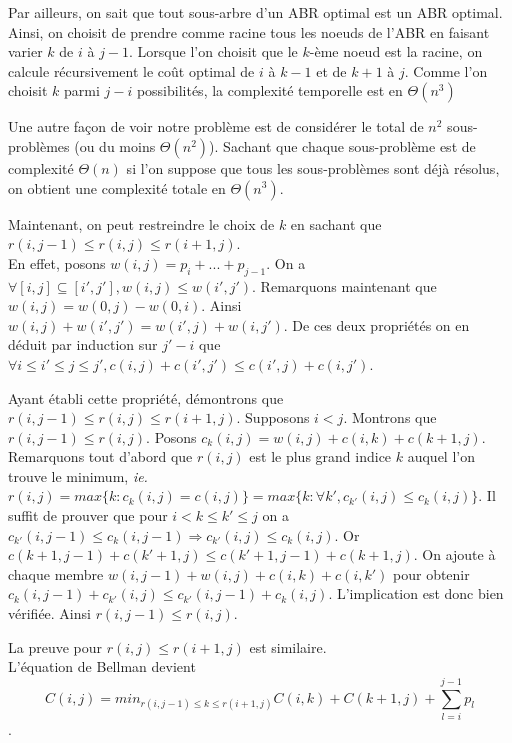 \documentclass[a4paper, 10pt, french]{article}
\begin{document}
Par ailleurs, on sait que tout sous-arbre d'un ABR optimal est un ABR optimal. Ainsi, on choisit de prendre comme racine tous les noeuds de l'ABR en faisant varier $k$ de $i$ à $j - 1$. Lorsque l'on choisit que le $k$-ème noeud est la racine, on calcule récursivement le coût optimal de $i$ à $k - 1$ et de $k + 1$ à $j$. Comme l'on choisit $k$ parmi $j - i$ possibilités, la complexité temporelle est en $\Theta(n^3)$

Une autre façon de voir notre problème est de considérer le total de $n^2$ sous-problèmes (ou du moins $\Theta(n^2)$). Sachant que chaque sous-problème est de complexité $\Theta(n)$ si l'on suppose que tous les sous-problèmes sont déjà résolus, on obtient une complexité totale en $\Theta(n^3)$.

Maintenant, on peut restreindre le choix de $k$ en sachant que $r(i, j - 1) \leq r(i, j) \leq r(i + 1, j)$. \\

En effet, posons $w(i, j) = p_{i} + ... + p_{j - 1}$. On a $\forall [i, j] \subseteq [i', j'], w(i, j) \leq w(i', j')$. Remarquons maintenant que $w(i, j) = w(0, j) - w(0, i)$. Ainsi $w(i, j) + w(i', j') = w(i', j) + w(i, j')$. De ces deux propriétés on en déduit par induction sur $j' - i$ que $\forall i \leq i'\leq j \leq j', c(i, j) + c(i', j') \leq c(i', j) + c(i, j')$.

Ayant établi cette propriété, démontrons que $r(i, j - 1) \leq r(i, j) \leq r(i + 1, j)$. Supposons $i < j$. Montrons que $r(i, j - 1) \leq r(i, j)$. Posons $c_k(i, j) = w(i, j) + c(i, k) + c(k + 1, j)$. Remarquons tout d'abord que $r(i, j)$ est le plus grand indice $k$ auquel l'on trouve le minimum, {\em ie.} $r(i, j) = max\{k: c_k(i, j) = c(i, j)\} = max\{k : \forall k', c_{k'}(i, j) \leq c_k(i, j)\}$.  Il suffit de prouver que pour $i < k \leq k' \leq j$ on a $c_{k'}(i, j - 1) \leq c_k(i, j - 1) \Rightarrow c_{k'}(i, j) \leq c_k(i, j)$. Or $c(k + 1, j - 1) + c(k' + 1, j) \leq c(k' + 1, j - 1) + c(k + 1, j)$. On ajoute à chaque membre $w(i, j - 1) + w(i, j) + c(i, k) + c(i, k')$ pour obtenir $c_k(i, j - 1) + c_{k'}(i, j) \leq c_{k'}(i, j - 1) + c_k(i, j)$. L'implication est donc bien vérifiée. Ainsi $r(i, j - 1) \leq r(i, j)$.

La preuve pour $r(i, j) \leq r(i + 1, j)$ est similaire. \\

L'équation de Bellman devient $$C(i, j) = min_{r(i, j - 1) \leq k \leq r(i + 1, j)} C(i, k) + C(k + 1, j) + \sum \limits_{l = i}^{j - 1} p_l$$.
\end{document}
